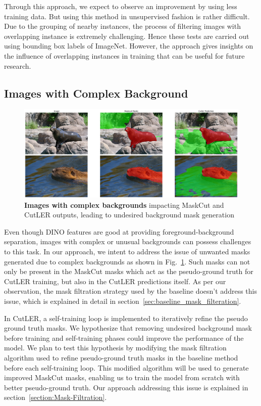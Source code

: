 Through this approach, we expect to observe an improvement by using less training data. But using this method in unsupervised fashion is rather difficult. Due to the grouping of nearby instances, the process of filtering images with overlapping instance is extremely challenging. Hence these tests are carried out using bounding box labels of ImageNet. However, the approach gives insights on the influence of overlapping instances in training that can be useful for future research.

\subsection{Images with Complex Background}
\begin{figure}
	\centering
	\includegraphics[width=1\textwidth]{Images/main/cutler-prob-noisy-bg.png}
	\caption[\textbf{Cutler's Performance on Images with Complex Background}]{\textbf{Images with complex backgrounds} impacting MaskCut and CutLER outputs, leading to undesired background mask generation}
	\label{fig:cutler_noisy_bg_eg}
\end{figure}

Even though DINO features are good at providing foreground-background separation, images with complex or unusual backgrounds can possess challenges to this task. In our approach, we intent to address the issue of unwanted masks generated due to complex backgrounds as shown in Fig.~\ref{fig:cutler_noisy_bg_eg}. Such masks can not only be present in the MaskCut masks which act as the pseudo-ground truth for CutLER training, but also in the CutLER predictions itself. As per our observation, the mask filtration strategy used by the baseline doesn't address this issue, which is explained in detail in section~\ref{sec:baseline_mask_filteration}.

In CutLER, a self-training loop is implemented to iteratively refine the pseudo ground truth masks. We hypothesize that removing undesired background mask before training and self-training phases could improve the performance of the model. We plan to test this hypothesis by modifying the mask filtration algorithm used to refine pseudo-ground truth masks in the baseline method before each self-training loop. This modified algorithm will be used to generate improved MaskCut masks, enabling us to train the model from scratch with better pseudo-ground truth. Our approach addressing this issue is explained in section~\ref{section:Mask-Filtration}.

